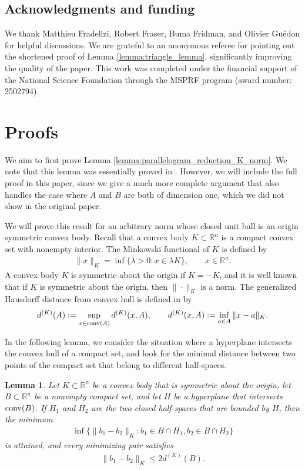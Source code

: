 \documentclass[11pt]{article}
\newtheorem{lemma}{Lemma}[section]
\begin{document}
\subsection{Acknowledgments and funding} We thank Matthieu Fradelizi, Robert Fraser, Buma Fridman, and Olivier Guédon for helpful discussions. We are grateful to an anonymous referee for pointing out the shortened proof of Lemma \ref{lemma:triangle_lemma}, significantly improving the quality of the paper. This work was completed under the financial support of the National Science Foundation through the MSPRF program (award number: 2502794). 

\section{Proofs}

We aim to first prove Lemma \ref{lemma:parallelogram_reduction_K_norm}. We note that this lemma was essentially proved in \cite{meyer2}. However, we will include the full proof in this paper, since we give a much more complete argument that also handles the case where $A$ and $B$ are both of dimension one, which we did not show in the original paper.

We will prove this result for an arbitrary norm whose closed unit ball is an origin symmetric convex body. Recall that a convex body $K\subset\mathbb{R}^n$ is a compact convex set with nonempty interior. The Minkowski functional of $K$ is defined by
\begin{align*}
    \|x\|_K=\inf\{\lambda>0:x\in \lambda K\},\qquad x\in \mathbb{R}^n.
\end{align*}
A convex body $K$ is symmetric about the origin if $K=-K$, and it is well known that if $K$ is symmetric about the origin, then $\|\cdot \|_K$ is a norm. The generalized Hausdorff distance from convex hull is defined in \cite{fradelizi1} by
\begin{align*}
    d^{(K)}(A):=\sup_{x\in \textup{conv}(A)}d^{(K)}(x,A),\qquad d^{(K)}(x,A):=\inf_{a\in A}\|x-a\|_K.
\end{align*}

In the following lemma, we consider the situation where a hyperplane intersects the convex hull of a compact set, and look for the minimal distance between two points of the compact set that belong to different half-spaces.

\begin{lemma}\label{lemma:opposite_hyperplane}
    Let $K\subset\mathbb{R}^n$ be a convex body that is symmetric about the origin, let $B\subset\mathbb{R}^n$ be a nonempty compact set, and let $H$ be a hyperplane that intersects $\textup{conv}(B)$. If $H_1$ and $H_2$ are the two closed half-spaces that are bounded by $H$, then the minimum
    \begin{align*}
        \inf\{\|b_1-b_2\|_K:b_1\in B\cap H_1,b_2\in B\cap H_2\}
    \end{align*}
    is attained, and every minimizing pair satisfies 
    \begin{align*}
        \|b_1-b_2\|_K\leq 2d^{(K)}(B).
    \end{align*}
\end{lemma}
\end{document}
